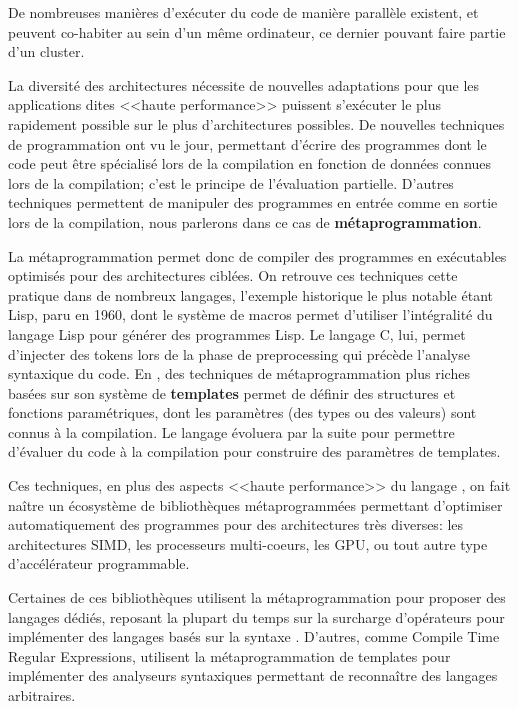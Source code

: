 \documentclass[main]{subfiles}
\begin{document}
De nombreuses mani\`eres d'ex\'ecuter du code de mani\`ere parall\`ele existent,
et peuvent co-habiter au sein d'un m\^eme ordinateur, ce dernier pouvant faire
partie d'un cluster.

La diversit\'e des architectures n\'ecessite de nouvelles adaptations pour que
les applications dites <<haute performance>> puissent s'ex\'ecuter
le plus rapidement possible sur le plus d'architectures possibles.
De nouvelles techniques de programmation ont vu le jour, permettant d'\'ecrire
des programmes dont le code peut \^etre sp\'ecialis\'e lors de la compilation
en fonction de donn\'ees connues lors de la compilation;
c'est le principe de l'\'evaluation partielle. D'autres techniques permettent
de manipuler des programmes en entr\'ee comme en sortie lors de la compilation,
nous parlerons dans ce cas de \textbf{m\'etaprogrammation}.

La m\'etaprogrammation permet donc de compiler des programmes en ex\'ecutables
optimis\'es pour des architectures cibl\'ees. On retrouve ces techniques cette
pratique dans de nombreux langages, l'exemple historique le plus notable \'etant
Lisp, paru en 1960, dont le syst\`eme de macros permet d'utiliser
l'int\'egralit\'e du langage Lisp pour g\'en\'erer des programmes Lisp.
Le langage C, lui, permet d'injecter des tokens lors de la phase de
preprocessing qui pr\'ec\`ede l'analyse syntaxique du code. En \cpp,
des techniques de m\'etaprogrammation plus riches bas\'ees sur son syst\`eme de
\textbf{templates} permet de d\'efinir des structures et fonctions
param\'etriques, dont les param\`etres (des types ou des valeurs) sont
connus \`a la compilation. Le langage \'evoluera par la suite pour permettre
d'\'evaluer du code \cpp \`a la compilation pour construire des param\`etres de
templates.

Ces techniques, en plus des aspects <<haute performance>> du langage \cpp,
on fait na\^itre un \'ecosyst\`eme de biblioth\`eques m\'etaprogramm\'ees
permettant d'optimiser automatiquement des programmes pour des architectures
tr\`es diverses: les architectures SIMD, les processeurs multi-coeurs, les GPU,
ou tout autre type d'acc\'el\'erateur programmable.

Certaines de ces biblioth\`eques utilisent la m\'etaprogrammation pour proposer
des langages d\'edi\'es, reposant la plupart du temps sur la surcharge
d'op\'erateurs pour impl\'ementer des langages bas\'es sur la syntaxe \cpp.
D'autres, comme Compile Time Regular Expressions, utilisent
la m\'etaprogrammation de templates pour impl\'ementer des analyseurs
syntaxiques permettant de reconna\^itre des langages arbitraires.
\end{document}

